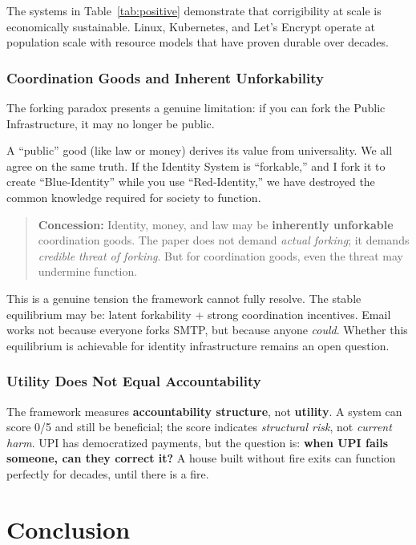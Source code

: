 \documentclass{article}
\begin{document}
The systems in Table~\ref{tab:positive} demonstrate that corrigibility at scale is economically sustainable. Linux, Kubernetes, and Let's Encrypt operate at population scale with resource models that have proven durable over decades.

\subsubsection{Coordination Goods and Inherent Unforkability}
\label{subsec:coordination}

The forking paradox presents a genuine limitation: if you can fork the Public Infrastructure, it may no longer be public.

A ``public'' good (like law or money) derives its value from universality. We all agree on the same truth. If the Identity System is ``forkable,'' and I fork it to create ``Blue-Identity'' while you use ``Red-Identity,'' we have destroyed the common knowledge required for society to function.

\begin{quote}
\textbf{Concession:} Identity, money, and law may be \textbf{inherently unforkable} coordination goods. The paper does not demand \textit{actual forking}; it demands \textit{credible threat of forking}. But for coordination goods, even the threat may undermine function.
\end{quote}

This is a genuine tension the framework cannot fully resolve. The stable equilibrium may be: latent forkability + strong coordination incentives. Email works not because everyone forks SMTP, but because anyone \textit{could}. Whether this equilibrium is achievable for identity infrastructure remains an open question.

\subsubsection{Utility Does Not Equal Accountability}
\label{subsec:utility}

The framework measures \textbf{accountability structure}, not \textbf{utility}. A system can score 0/5 and still be beneficial; the score indicates \textit{structural risk}, not \textit{current harm}. UPI has democratized payments, but the question is: \textbf{when UPI fails someone, can they correct it?} A house built without fire exits can function perfectly for decades, until there is a fire.

\section{Conclusion}
\end{document}

